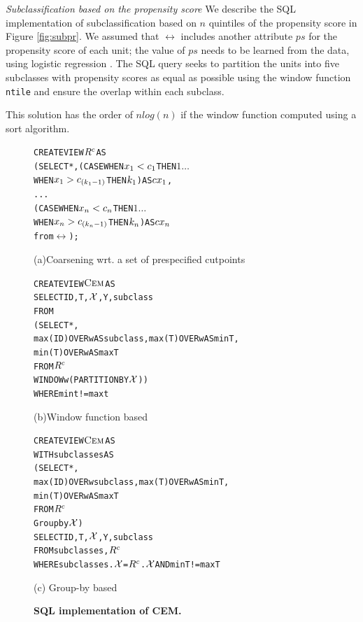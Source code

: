 {\it Subclassification based on the propensity score} We describe the
SQL implementation of subclassification based on $n$ quintiles of the
propensity score in Figure \ref{fig:subpr}.  We assumed that $\rel$
includes another attribute $ps$ for the propensity score of each unit;
the value of $ps$ needs to be learned from the data, using logistic
regression \cite{Rubin1983b}.  The SQL query seeks to partition
the units into five subclasses with propensity scores as equal as
possible using the window function {\verb|ntile|} and ensure the overlap within each subclass.  This solution has the order of $nlog(n)$ if the window
function computed using a sort algorithm.







\begin{figure}
\begin{alltt} \scriptsize
CREATE VIEW \(\crele\) AS
(SELECT *, (CASE WHEN \(x\sb{1}<c\sb{1}\)  THEN \(1 \ldots\)
                 WHEN \(x\sb{1}>c\sb{(k\sb{1}-1)}\) THEN \(k\sb{1}\)) AS \(cx\sb{1}\),
              . . .
           (CASE WHEN \(x\sb{n}<c\sb{n}\)  THEN \(1 \ldots\)
                 WHEN \(x\sb{n}>c\sb{(k\sb{n}-1)}\) THEN \(k\sb{n}\)) AS \(cx\sb{n}\)
from \(\rel\));
\end{alltt} \vspace{-.2cm} \hspace{0.7cm}
{(a)Coarsening wrt. a set of prespecified cutpoints}
\vspace{-.3cm}
\begin{alltt} \scriptsize
CREATE VIEW \(\cem\) AS
SELECT ID, T, \(\ccv\), Y, subclass
FROM
  (SELECT *,
          max(ID) OVER w AS subclass, max(T) OVER w AS minT,
          min(T) OVER w AS maxT
   FROM \(\crele\)
   WINDOW w (PARTITION BY \(\ccv\)))
WHERE mint!=maxt
\end{alltt}\vspace{-.2cm} \hspace{2.5cm}
(b)Window function based
\vspace{-.3cm}
\begin{alltt} \scriptsize
CREATE VIEW \(\cem\) AS
WITH subclasses AS
  (SELECT *,
          max(ID) OVER w subclass, max(T) OVER w AS minT,
          min(T) OVER w AS maxT
   FROM \(\crele\)
   Group by \(\ccv\))
SELECT ID, T, \(\ccv\), Y, subclass
FROM subclasses,\(\crele\)
WHERE subclasses.\(\ccv\)=\(\crele\).\(\ccv\)  AND  minT!=maxT

\end{alltt}\vspace{-.2cm}\hspace{2.5cm}
(c) Group-by based
\vspace{-.1cm}
  \caption{\bf{SQL implementation of CEM.}}\label{fig:cem}
\end{figure}


